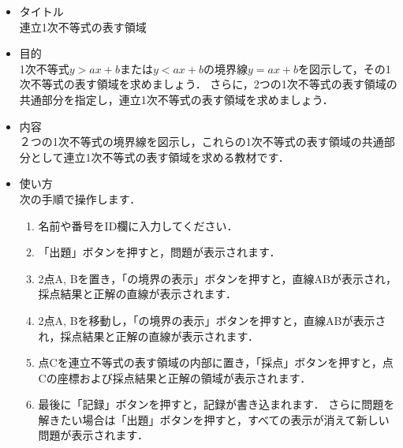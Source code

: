 \documentclass[20]{jarticle}
\begin{document}
\begin{itemize}
\item タイトル\\
連立1次不等式の表す領域

\item 目的\\
1次不等式$y>ax+b$または$y<ax+b$の境界線$y=ax+b$を図示して，その1次不等式の表す領域を求めましょう．
さらに，2つの1次不等式の表す領域の共通部分を指定し，連立1次不等式の表す領域を求めましょう．

\item 内容\\
２つの1次不等式の境界線を図示し，これらの1次不等式の表す領域の共通部分として連立1次不等式の表す領域を求める教材です．

\item 使い方\\
次の手順で操作します．
\begin{enumerate}[(1)]
\item 名前や番号をID欄に入力してください．
\item 「出題」ボタンを押すと，問題が表示されます．
\item 2点A, Bを置き，「の境界の表示」ボタンを押すと，直線ABが表示され，採点結果と正解の直線が表示されます．
\item 2点A, Bを移動し，「の境界の表示」ボタンを押すと，直線ABが表示され，採点結果と正解の直線が表示されます．
\item 点Cを連立不等式の表す領域の内部に置き，「採点」ボタンを押すと，点Cの座標および採点結果と正解の領域が表示されます．
\item 最後に「記録」ボタンを押すと，記録が書き込まれます．
さらに問題を解きたい場合は「出題」ボタンを押すと，すべての表示が消えて新しい問題が表示されます．
\end{enumerate}

\end{itemize}
\end{document}
